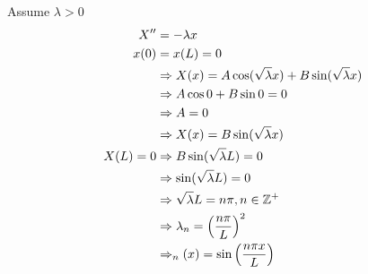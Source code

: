 \begin{enumerate}
  Assume $\lambda > 0$
  \begin{align}
    X^{\prime\prime} & = -\lambda x\\
    x(0) & = x(L) = 0\\
    & \Rightarrow X(x) = A \cos(\sqrt{\lambda} x) + B\sin(\sqrt{\lambda} x)\\
    & \Rightarrow A \cos 0 + B \sin 0 = 0\\
    & \Rightarrow A = 0\\
    & \Rightarrow X(x) = B \sin(\sqrt \lambda x)\\
    X(L) = 0 & \Rightarrow B \sin(\sqrt \lambda L) = 0\\
    & \Rightarrow \sin(\sqrt \lambda L) = 0\\
    & \Rightarrow \sqrt \lambda L = n \pi, n \in \mathbb Z^+\\
    & \Rightarrow \lambda_n = \Big( \frac{n \pi}{L} \Big)^2\\
    & \Rightarrow_n(x) = \sin \Big( \frac{n \pi x}{L} \Big)
  \end{align}
\end{enumerate}

